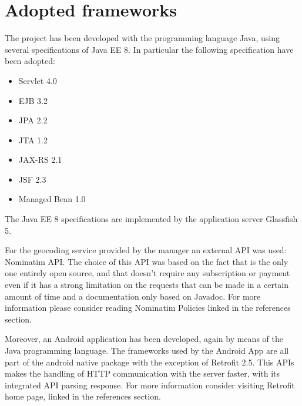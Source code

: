 
\section{Adopted frameworks}

The project has been developed with the programming language Java, using several specifications of Java EE 8.
In particular the following specification have been adopted:

\begin{itemize}
\item Servlet 4.0
\item EJB 3.2
\item JPA 2.2
\item JTA 1.2
\item JAX-RS 2.1
\item JSF 2.3
\item Managed Bean 1.0
\end{itemize}
The Java EE 8 specifications are implemented by the application server Glassfish 5.
\vspace{1em}

\noindent
For the geocoding service provided by the manager an external API was used: Nominatim API. 
The choice of this API was based on the fact that is the only one entirely open source, and that doesn't require any subscription or payment even if it has a strong limitation on the requests that can be made in a certain amount of time and a documentation only based on Javadoc.
For more information please consider reading Nominatim Policies linked in the references section.
\vspace{1em}

\noindent
Moreover, an Android application has been developed, again by means of the Java programming language.
The frameworks used by the Android App are all part of the android native package with the exception of Retrofit 2.5. This APIs makes the handling of HTTP communication with the server faster, with its integrated API parsing response. 
For more information consider visiting Retrofit home page, linked in the references section.
